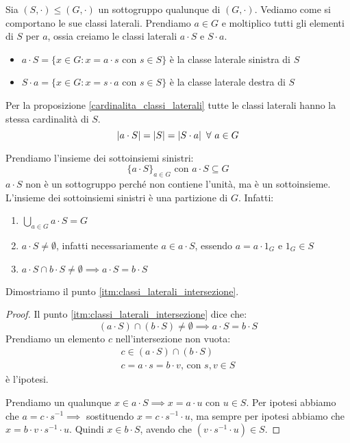 Sia $(S, \cdot) \le (G, \cdot)$ un sottogruppo qualunque di $(G, \cdot)$. Vediamo come si comportano le sue classi laterali. Prendiamo $a \in G$ e moltiplico tutti gli elementi di $S$ per $a$, ossia creiamo le classi laterali $a \cdot S$ e $S \cdot a$.
\begin{itemize}
    \item $a \cdot S = \{ x \in G : x = a \cdot s \text{ con } s \in S \}$ \`e la classe laterale sinistra di $S$
    \item $S \cdot a = \{ x \in G : x = s \cdot a \text{ con } s \in S \}$ \`e la classe laterale destra di $S$
\end{itemize}

Per la proposizione \ref{cardinalita_classi_laterali} tutte le classi laterali hanno la stessa cardinalit\`a di $S$.
\[
\abs{a \cdot S} = \abs{S} = \abs{S \cdot a} \forall a \in G
\]

Prendiamo l'insieme dei sottoinsiemi sinistri:
\[
\{ a \cdot S\}_{a \in G} \text{ con } a \cdot S \subseteq G
\]
$a \cdot S$ non \`e un sottogruppo perch\'e non contiene l'unit\`a, ma \`e un sottoinsieme. L'insieme dei sottoinsiemi sinistri \`e una partizione di $G$. Infatti:
\begin{enumerate}
    \item $\bigcup_{a \in G} a \cdot S = G$
    \item $a \cdot S \neq \emptyset$, infatti necessariamente $a \in a \cdot S$, essendo $a = a \cdot 1_G$ e $1_G \in S$
    \item\label{itm:classi_laterali_intersezione} $a \cdot S \cap b \cdot S \neq \emptyset \implies a \cdot S = b \cdot S$
\end{enumerate}

Dimostriamo il punto \ref{itm:classi_laterali_intersezione}.
\begin{proof}
Il punto \ref{itm:classi_laterali_intersezione} dice che:
\[
(a \cdot S) \cap (b \cdot S) \neq \emptyset \implies a \cdot S = b \cdot S
\]
Prendiamo un elemento $c$ nell'intersezione non vuota:
\begin{gather*}
c \in (a \cdot S) \cap (b \cdot S) \\
c = a \cdot s = b \cdot v \text{, con } s, v \in S
\end{gather*}
\`e l'ipotesi.

Prendiamo un qualunque $x \in a \cdot S \implies x = a \cdot u$ con $u \in S$. Per ipotesi abbiamo che $a = c \cdot s^{-1} \implies $ sostituendo $x = c \cdot s^{-1} \cdot u$, ma sempre per ipotesi abbiamo che $x = b \cdot v \cdot s^{-1} \cdot u$. Quindi $x \in b \cdot S$, avendo che $(v \cdot s^{-1} \cdot u) \in S$.
\end{proof}

